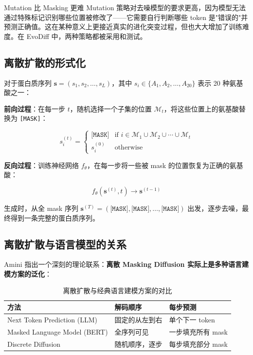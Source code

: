 \begin{warningbox}{Mutation 比 Masking 更难}
Mutation 策略对去噪模型的要求更高，因为模型无法通过特殊标记识别哪些位置被修改了——它需要自行判断哪些 token 是"错误的"并预测正确值。这在某种意义上更接近真实的进化突变过程，但也大大增加了训练难度。在 EvoDiff 中，两种策略都被采用和测试。
\end{warningbox}

\subsection{离散扩散的形式化}

对于蛋白质序列 $\mathbf{s} = (s_1, s_2, \ldots, s_L)$，其中 $s_i \in \{A_1, A_2, \ldots, A_{20}\}$ 表示 20 种氨基酸之一：

\textbf{前向过程}：在每一步 $t$，随机选择一个子集的位置 $\mathcal{M}_t$，将这些位置上的氨基酸替换为 \texttt{[MASK]}：

$$s_i^{(t)} = \begin{cases} \texttt{[MASK]} & \text{if } i \in \mathcal{M}_1 \cup \mathcal{M}_2 \cup \cdots \cup \mathcal{M}_t \\ s_i^{(0)} & \text{otherwise} \end{cases}$$

\textbf{反向过程}：训练神经网络 $f_\theta$，在每一步将一些被 mask 的位置恢复为正确的氨基酸：

$$f_\theta(\mathbf{s}^{(t)}, t) \rightarrow \mathbf{s}^{(t-1)}$$

生成时，从全 mask 序列 $\mathbf{s}^{(T)} = (\texttt{[MASK]}, \texttt{[MASK]}, \ldots, \texttt{[MASK]})$ 出发，逐步去噪，最终得到一条完整的蛋白质序列。

\subsection{离散扩散与语言模型的关系}

Amini 指出一个深刻的理论联系：\textbf{离散 Masking Diffusion 实际上是多种语言建模方案的泛化}：

\begin{table}[H]
\centering
\caption{离散扩散与经典语言建模方案的对比}
\begin{tabular}{@{}lll@{}}
\toprule
\textbf{方法} & \textbf{解码顺序} & \textbf{每步预测} \\
\midrule
Next Token Prediction (LLM) & 固定的从左到右 & 单个下一 token \\
Masked Language Model (BERT) & 全序列可见 & 一步填充所有 mask \\
Discrete Diffusion & 随机顺序，逐步 & 每步填充部分 mask \\
\bottomrule
\end{tabular}
\end{table}


